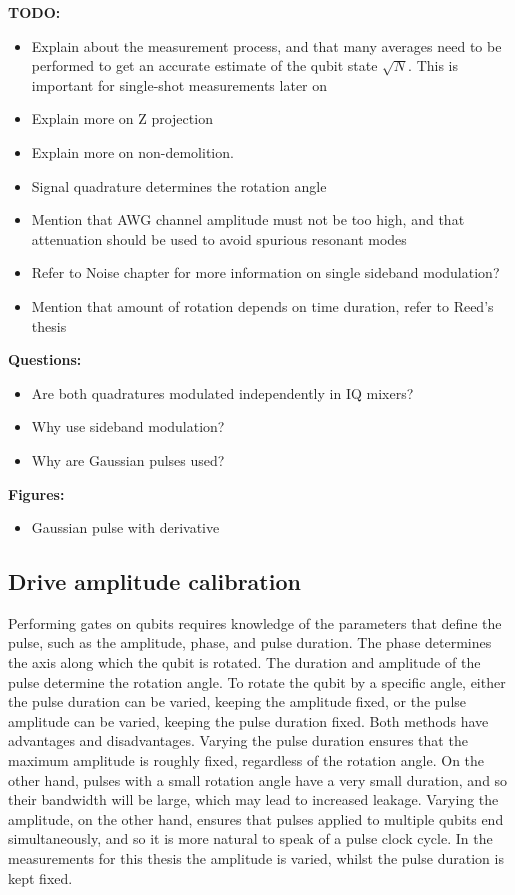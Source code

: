         \textbf{TODO:}
        \begin{itemize}
          \item Explain about the measurement process, and that many averages need to be performed to get an accurate estimate of the qubit state $\sqrt{N}$. This is important for single-shot measurements later on
          \item Explain more on Z projection
          \item Explain more on non-demolition.
          \item Signal quadrature determines the rotation angle
          \item Mention that AWG channel amplitude must not be too high, and that attenuation should be used to avoid spurious resonant modes
          \item Refer to Noise chapter for more information on single sideband modulation?
          \item Mention that amount of rotation depends on time duration, refer to Reed's thesis
        \end{itemize}

        \textbf{Questions:}
        \begin{itemize}
          \item Are both quadratures modulated independently in IQ mixers?
          \item Why use sideband modulation?
          \item Why are Gaussian pulses used?
         \end{itemize}

         \textbf{Figures:}
         \begin{itemize}
            \item Gaussian pulse with derivative
          \end{itemize}

      \subsection{Drive amplitude calibration}
        \label{ssec:Rabi}
        Performing gates on qubits requires knowledge of the parameters that define the pulse, such as the amplitude, phase, and pulse duration. The phase determines the axis along which the qubit is rotated. The duration and amplitude of the pulse determine the rotation angle. To rotate the qubit by a specific angle, either the pulse duration can be varied, keeping the amplitude fixed, or the pulse amplitude can be varied, keeping the pulse duration fixed. Both methods have advantages and disadvantages. Varying the pulse duration ensures that the maximum amplitude is roughly fixed, regardless of the rotation angle. On the other hand, pulses with a small rotation angle have a very small duration, and so their bandwidth will be large, which may lead to increased leakage. Varying the amplitude, on the other hand, ensures that pulses applied to multiple qubits end simultaneously, and so it is more natural to speak of a pulse clock cycle. In the measurements for this thesis the amplitude is varied, whilst the pulse duration is kept fixed.

